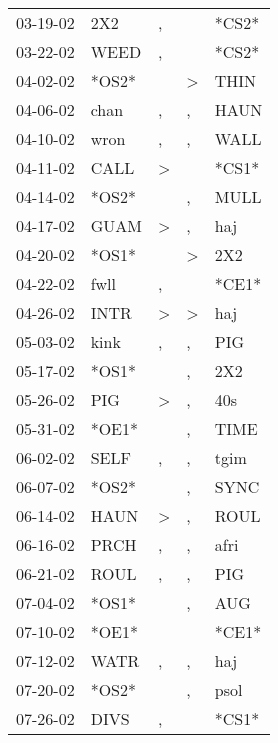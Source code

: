 \begin{supertabular}{lllll}
 03-19-02 &    2X2 &                , &               &  *CS2* \\
 03-22-02 &   WEED &                , &               &  *CS2* \\
 04-02-02 &  *OS2* &                  &  \textgreater &   THIN \\
 04-06-02 &   chan &                , &             , &   HAUN \\
 04-10-02 &   wron &                , &             , &   WALL \\
 04-11-02 &   CALL &     \textgreater &               &  *CS1* \\
 04-14-02 &  *OS2* &                  &             , &   MULL \\
 04-17-02 &   GUAM &     \textgreater &             , &    haj \\
 04-20-02 &  *OS1* &                  &  \textgreater &    2X2 \\
 04-22-02 &   fwll &                , &               &  *CE1* \\
 04-26-02 &   INTR &     \textgreater &  \textgreater &    haj \\
 05-03-02 &   kink &                , &             , &    PIG \\
 05-17-02 &  *OS1* &                  &             , &    2X2 \\
 05-26-02 &    PIG &     \textgreater &             , &    40s \\
 05-31-02 &  *OE1* &                  &             , &   TIME \\
 06-02-02 &   SELF &                , &             , &   tgim \\
 06-07-02 &  *OS2* &                  &             , &   SYNC \\
 06-14-02 &   HAUN &     \textgreater &             , &   ROUL \\
 06-16-02 &   PRCH &                , &             , &   afri \\
 06-21-02 &   ROUL &                , &             , &    PIG \\
 07-04-02 &  *OS1* &                  &             , &    AUG \\
 07-10-02 &  *OE1* &                  &               &  *CE1* \\
 07-12-02 &   WATR &                , &             , &    haj \\
 07-20-02 &  *OS2* &                  &             , &   psol \\
 07-26-02 &   DIVS &                , &               &  *CS1* \\

\end{supertabular}
